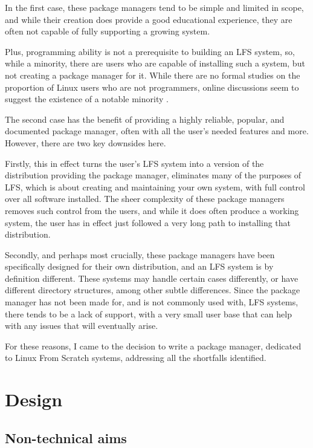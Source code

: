 \documentclass[10pt]{article}
\begin{document}
In the first case, these package managers tend to be simple and limited in scope, and while their creation does provide a good educational experience, they are often not capable of fully supporting a growing system.

Plus, programming ability is not a prerequisite to building an LFS system, so, while a minority, there are users who are capable of installing such a system, but not creating a package manager for it. While there are no formal studies on the proportion of Linux users who are not programmers, online discussions seem to suggest the existence of a notable minority \cite{RedditLinuxNonProg}.

The second case has the benefit of providing a highly reliable, popular, and documented package manager, often with all the user's needed features and more. However, there are two key downsides here.

Firstly, this in effect turns the user's LFS system into a version of the distribution providing the package manager, eliminates many of the purposes of LFS, which is about creating and maintaining your own system, with full control over all software installed. The sheer complexity of these package managers removes such control from the users, and while it does often produce a working system, the user has in effect just followed a very long path to installing that distribution.

Secondly, and perhaps most crucially, these package managers have been specifically designed for their own distribution, and an LFS system is by definition different. These systems may handle certain cases differently, or have different directory structures, among other subtle differences. Since the package manager has not been made for, and is not commonly used with, LFS systems, there tends to be a lack of support, with a very small user base that can help with any issues that will eventually arise.

For these reasons, I came to the decision to write a package manager, dedicated to Linux From Scratch systems, addressing all the shortfalls identified.

\section{Design}

\subsection{Non-technical aims} \label{AimsSS}
\end{document}
